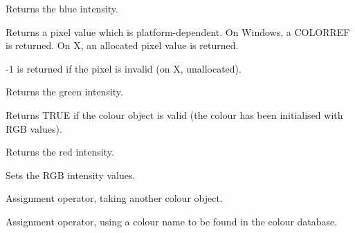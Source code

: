 \label{wxcolourblue}


Returns the blue intensity.

\label{wxcolourgetpixel}


Returns a pixel value which is platform-dependent. On Windows, a COLORREF is returned.
On X, an allocated pixel value is returned.

-1 is returned if the pixel is invalid (on X, unallocated).

\label{wxcolourgreen}


Returns the green intensity.

\label{wxcolourok}


Returns TRUE if the colour object is valid (the colour has been initialised with RGB values).

\label{wxcolourred}


Returns the red intensity.

\label{wxcolourset}


Sets the RGB intensity values.

\label{wxcolourassign}


Assignment operator, taking another colour object.


Assignment operator, using a colour name to be found in the colour database.



\label{wxcolourequality}


